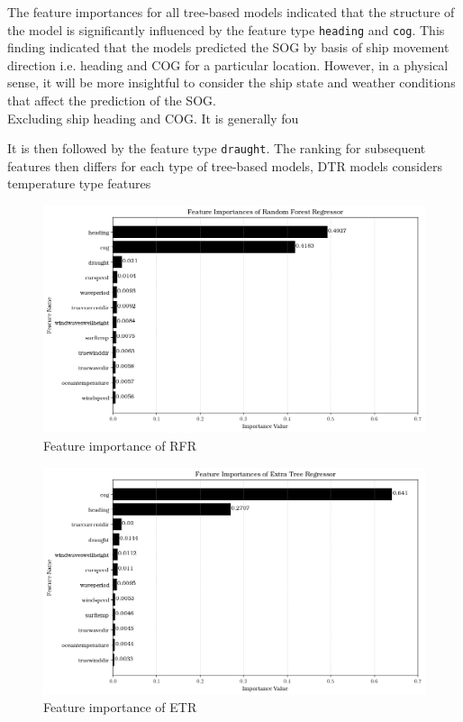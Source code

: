 The feature importances for all tree-based models indicated that the structure of the model is significantly influenced by the feature type {\tt heading} and {\tt cog}. This finding indicated that the models predicted the SOG by basis of ship movement direction i.e. heading and COG for a particular location. However, in a physical sense, it will be more insightful to consider the ship state and weather conditions that affect the prediction of the SOG.\\

Excluding ship heading and COG. It is generally fou

It is then followed by the feature type {\tt draught}. The ranking for subsequent features then differs for each type of tree-based models, DTR models considers temperature type features  

\begin{figure}[h]
    \centering
        \includegraphics[width=.85\textwidth]{02_figures/rfr_ftr_importance.png}
        \caption{Feature importance of RFR}
        \label{fig:ftr_impo_rfr}
\end{figure}

\begin{figure}[h]
    \centering
        \includegraphics[width=.85\textwidth]{02_figures/etr_ftr_importance.png}
        \caption{Feature importance of ETR}
        \label{fig:ftr_impo_etr}
\end{figure}




